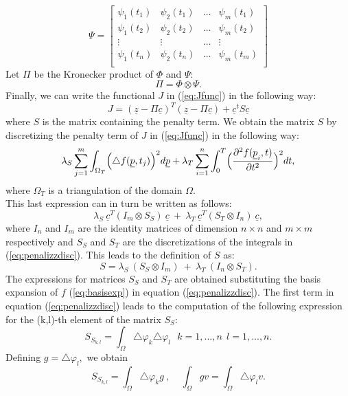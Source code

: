 \documentclass[a4paper,11pt,twoside,openright]{book}							%
\begin{document}
$$
\Psi = 
\begin{bmatrix}
\psi_{1}( t_1) & \psi_{2}( t_1) & \hdots & \psi_{m}( t_1)  \\
\psi_{1}( t_2) & \psi_{2}( t_2) & \hdots & \psi_{m}( t_2)  \\
\vdots & \vdots & \hdots & \vdots \\
\psi_{1}( t_n) & \psi_{2}( t_n) & \hdots & \psi_{m}( t_m)  \\
\end{bmatrix}
$$
Let $\Pi$ be the Kronecker product of $ \Phi $ and $\Psi$:
$$ \Pi = \Phi \otimes \Psi .$$
Finally, we can write the functional $J$ in (\ref{eq:Jfunc}) in the following way:
\begin{equation} 
\label{eq:Jmatr}
J = (\underline z - \Pi \underline c)^T (\underline z - \Pi \underline c) + \underline c^t S \underline c 
\end{equation}
where $S$ is the matrix containing the penalty term.
We obtain the matrix $S$ by discretizing the penalty term of $J$ in (\ref{eq:Jfunc}) in the following way:
\begin{equation}
\label{eq:penalizzdisc}
\lambda_S  \sum_{j=1}^m \int_{\Omega_T} \Bigl( \triangle f(\underline p,t_j)  \Bigr)^2 d \underline p+ \lambda_T \sum_{i=1}^n\int_0^T \Bigl( \frac{\partial^2 f(\underline p_i,t) }{\partial t ^2} \Bigr)^2 dt ,
\end{equation}
where $\Omega_T$ is a triangulation of the domain $\Omega$.\\
This last expression can in turn be written as follows:
$$ \lambda_S\   \underline c^T (I_m \otimes S_S)\  \underline c   \ +\  \lambda_T\  \underline c^T ( S_T \otimes I_n)\  \underline c  ,$$
where $I_n$ and $I_m$ are the identity matrices of dimension $n \times n$ and $m \times m$ respectively and $S_S$ and $S_T$ are the discretizations of the integrals in (\ref{eq:penalizzdisc}). This leads to the definition of $S$ as:
$$ S = \lambda_S\    (S_S \otimes I_m)   \ +\  \lambda_T\   (I_n \otimes S_T)  .$$
The expressions for matrices $S_S$ and $S_T$ are obtained substituting the basis expansion of $f$ (\ref{eq:basisexp}) in equation (\ref{eq:penalizzdisc}).
The first term in equation (\ref{eq:penalizzdisc}) leads to the computation of the following expression for the (k,l)-th element of the matrix $S_S$:
$$S_{S_{k,l}} = \int_\Omega \triangle \varphi_k \triangle \varphi_l \ \ \ k = 1, ... , n\ \ l = 1, ... , n.$$
Defining $ g = \triangle\varphi_l ,$ we obtain
$$ S_{S_{k,l}} = \int_\Omega \triangle \varphi_k g \ , \ \ \ \ \ \int_\Omega g v = \int_\Omega \triangle \varphi_l v.$$
\end{document}
